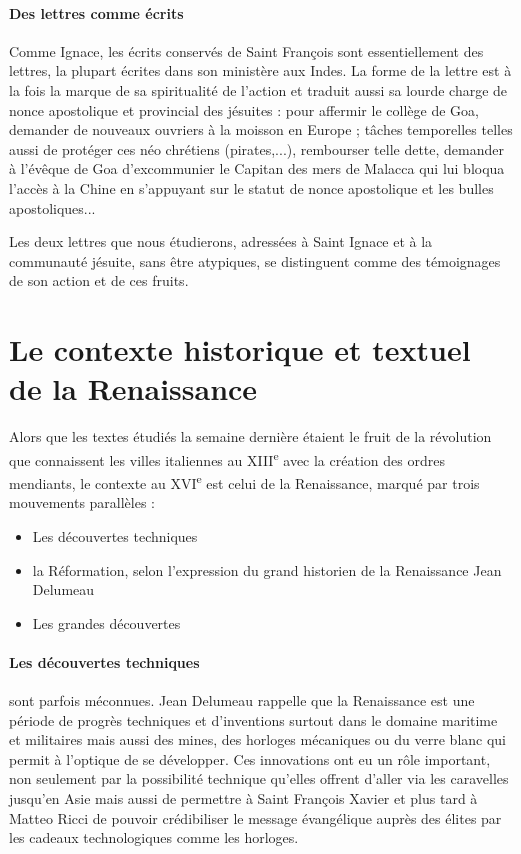 \paragraph{Des lettres comme écrits} Comme Ignace, les écrits conservés de Saint François  sont essentiellement des lettres, la plupart écrites dans son ministère aux Indes. La forme de la lettre est à la fois la marque de sa spiritualité de l'action et traduit aussi sa lourde charge de nonce apostolique et provincial des jésuites : pour affermir le collège de Goa, demander de nouveaux ouvriers à la moisson en Europe ; tâches temporelles telles aussi de protéger ces néo chrétiens (pirates,...), rembourser telle dette, demander à l'évêque de Goa d'excommunier le Capitan des mers de Malacca qui lui bloqua l'accès à la Chine en s'appuyant sur le statut de nonce apostolique et les bulles apostoliques... 

Les deux lettres que nous étudierons, adressées à Saint Ignace et à la communauté jésuite, sans être atypiques, se distinguent comme des témoignages de son action et de ces fruits.


\section{Le contexte historique et textuel de la Renaissance}

Alors que les textes étudiés la semaine dernière étaient le fruit de la révolution que connaissent les villes italiennes au XIII\textsuperscript{e} avec la création des ordres mendiants, le contexte au XVI\textsuperscript{e} est celui de la Renaissance,  marqué par trois mouvements parallèles :
\begin{itemize}
    \item Les découvertes techniques
    \item la Réformation, selon l'expression du grand historien de la Renaissance Jean Delumeau 
    \item Les grandes découvertes
\end{itemize}

\paragraph{Les découvertes techniques} sont parfois méconnues. Jean Delumeau rappelle que la Renaissance est une période de progrès techniques et d'inventions surtout dans le domaine maritime et militaires mais aussi des mines, des horloges mécaniques ou du verre blanc qui permit à l’optique de se développer. Ces innovations ont eu un rôle important, non seulement par la possibilité technique qu'elles offrent d'aller via les caravelles jusqu'en Asie mais aussi de permettre à Saint François Xavier et plus tard à Matteo Ricci de pouvoir crédibiliser le message évangélique auprès des élites par les cadeaux technologiques comme les horloges.  



